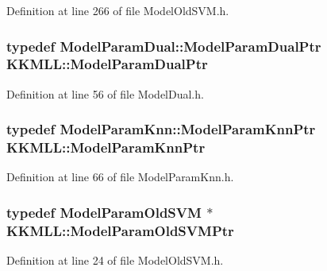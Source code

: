 Definition at line 266 of file Model\+Old\+S\+V\+M.\+h.

\subsubsection[{\texorpdfstring{Model\+Param\+Dual\+Ptr}{ModelParamDualPtr}}]{\setlength{\rightskip}{0pt plus 5cm}typedef {\bf Model\+Param\+Dual\+::\+Model\+Param\+Dual\+Ptr} {\bf K\+K\+M\+L\+L\+::\+Model\+Param\+Dual\+Ptr}}\hypertarget{namespace_k_k_m_l_l_ac0d00af7c9dc9b90ef0ce1a91ccd1c40}{}\label{namespace_k_k_m_l_l_ac0d00af7c9dc9b90ef0ce1a91ccd1c40}


Definition at line 56 of file Model\+Dual.\+h.

\subsubsection[{\texorpdfstring{Model\+Param\+Knn\+Ptr}{ModelParamKnnPtr}}]{\setlength{\rightskip}{0pt plus 5cm}typedef {\bf Model\+Param\+Knn\+::\+Model\+Param\+Knn\+Ptr} {\bf K\+K\+M\+L\+L\+::\+Model\+Param\+Knn\+Ptr}}\hypertarget{namespace_k_k_m_l_l_a9a43d46912e7043762296efe4f99bac9}{}\label{namespace_k_k_m_l_l_a9a43d46912e7043762296efe4f99bac9}


Definition at line 66 of file Model\+Param\+Knn.\+h.

\subsubsection[{\texorpdfstring{Model\+Param\+Old\+S\+V\+M\+Ptr}{ModelParamOldSVMPtr}}]{\setlength{\rightskip}{0pt plus 5cm}typedef {\bf Model\+Param\+Old\+S\+VM} $\ast$ {\bf K\+K\+M\+L\+L\+::\+Model\+Param\+Old\+S\+V\+M\+Ptr}}\hypertarget{namespace_k_k_m_l_l_a768d5bdb1e76c57162d3abec212326e4}{}\label{namespace_k_k_m_l_l_a768d5bdb1e76c57162d3abec212326e4}


Definition at line 24 of file Model\+Old\+S\+V\+M.\+h.

